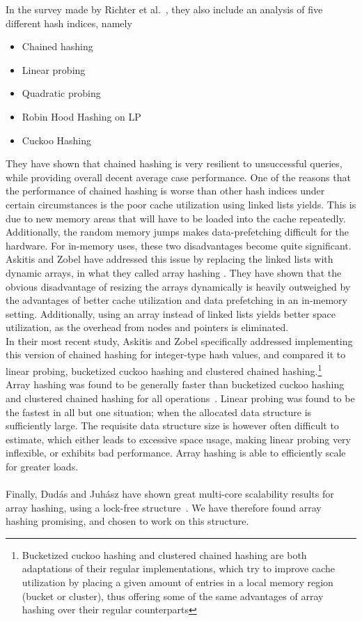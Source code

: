 \documentclass[11pt]{article} %
\begin{document}
In the survey made by Richter et al.~\cite{RAD15}, they also include an analysis of five different hash indices, namely
\begin{itemize}
  \item Chained hashing
  \item Linear probing
  \item Quadratic probing
  \item Robin Hood Hashing on LP
  \item Cuckoo Hashing
\end{itemize}
They have shown that chained hashing is very resilient to unsuccessful queries, while providing overall decent average case performance. One of the reasons that the performance of chained hashing is worse than other hash indices under certain circumstances is the poor cache utilization using linked lists yields. This is due to new memory areas that will have to be loaded into the cache repeatedly. Additionally, the random memory jumps makes data-prefetching difficult for the hardware. For in-memory uses, these two disadvantages become quite significant. \\

Askitis and Zobel have addressed this issue by replacing the linked lists with dynamic arrays, in what they called array hashing \cite{NA09, AJ05}. They have shown that the obvious disadvantage of resizing the arrays dynamically is heavily outweighed by the advantages of better cache utilization and data prefetching in an in-memory setting. Additionally, using an array instead of linked lists yields better space utilization, as the overhead from nodes and pointers is eliminated. \\

In their most recent study, Askitis and Zobel specifically addressed implementing this version of chained hashing for integer-type hash values, and compared it to linear probing, bucketized cuckoo hashing and clustered chained hashing.\footnote{Bucketized cuckoo hashing and clustered chained hashing are both adaptations of their regular implementations, which try to improve cache utilization by placing a given amount of entries in a local memory region (bucket or cluster), thus offering some of the same advantages of array hashing over their regular counterparts} \\

Array hashing was found to be generally faster than bucketized cuckoo hashing and clustered chained hashing for all operations~\cite{NA09}. Linear probing was found to be the fastest in all but one situation; when the allocated data structure is sufficiently large. The requisite data structure size is however often difficult to estimate, which either leads to excessive space usage, making linear probing very inflexible, or exhibits bad performance. Array hashing is able to efficiently scale for greater loads. \\
\\
Finally, Dudás and Juhász have shown great multi-core scalability results for array hashing, using a lock-free structure~\cite{ADSJ13}. We have therefore found array hashing promising, and chosen to work on this structure. 
\\
\end{document}
